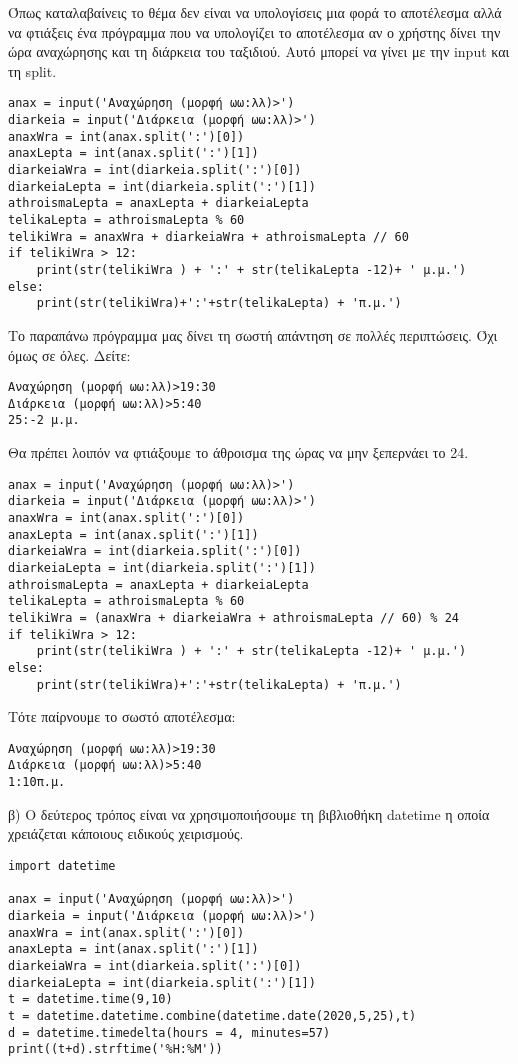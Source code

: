 Όπως καταλαβαίνεις το θέμα δεν είναι να υπολογίσεις μια φορά το αποτέλεσμα αλλά να φτιάξεις ένα πρόγραμμα που να υπολογίζει το αποτέλεσμα αν ο χρήστης δίνει την ώρα αναχώρησης και τη διάρκεια του ταξιδιού. Αυτό μπορεί να γίνει με την input και τη split.
\begin{lstlisting}
anax = input('Αναχώρηση (μορφή ωω:λλ)>')
diarkeia = input('Διάρκεια (μορφή ωω:λλ)>')
anaxWra = int(anax.split(':')[0])
anaxLepta = int(anax.split(':')[1])
diarkeiaWra = int(diarkeia.split(':')[0])
diarkeiaLepta = int(diarkeia.split(':')[1])
athroismaLepta = anaxLepta + diarkeiaLepta
telikaLepta = athroismaLepta % 60
telikiWra = anaxWra + diarkeiaWra + athroismaLepta // 60
if telikiWra > 12:
    print(str(telikiWra ) + ':' + str(telikaLepta -12)+ ' μ.μ.')
else:
    print(str(telikiWra)+':'+str(telikaLepta) + 'π.μ.')
\end{lstlisting}

Το παραπάνω πρόγραμμα μας δίνει τη σωστή απάντηση σε πολλές περιπτώσεις. Όχι όμως σε όλες. Δείτε:
\begin{lstlisting}
Αναχώρηση (μορφή ωω:λλ)>19:30
Διάρκεια (μορφή ωω:λλ)>5:40
25:-2 μ.μ.
\end{lstlisting}
Θα πρέπει λοιπόν να φτιάξουμε το άθροισμα της ώρας να μην ξεπερνάει το 24.
\begin{lstlisting}
anax = input('Αναχώρηση (μορφή ωω:λλ)>')
diarkeia = input('Διάρκεια (μορφή ωω:λλ)>')
anaxWra = int(anax.split(':')[0])
anaxLepta = int(anax.split(':')[1])
diarkeiaWra = int(diarkeia.split(':')[0])
diarkeiaLepta = int(diarkeia.split(':')[1])
athroismaLepta = anaxLepta + diarkeiaLepta
telikaLepta = athroismaLepta % 60
telikiWra = (anaxWra + diarkeiaWra + athroismaLepta // 60) % 24
if telikiWra > 12:
    print(str(telikiWra ) + ':' + str(telikaLepta -12)+ ' μ.μ.')
else:
    print(str(telikiWra)+':'+str(telikaLepta) + 'π.μ.')
\end{lstlisting}

Τότε παίρνουμε το σωστό αποτέλεσμα:
\begin{lstlisting}
Αναχώρηση (μορφή ωω:λλ)>19:30
Διάρκεια (μορφή ωω:λλ)>5:40
1:10π.μ.
\end{lstlisting}

β)
Ο δεύτερος τρόπος είναι να χρησιμοποιήσουμε τη βιβλιοθήκη datetime η οποία χρειάζεται κάποιους ειδικούς χειρισμούς.
\begin{lstlisting}
import datetime

anax = input('Αναχώρηση (μορφή ωω:λλ)>')
diarkeia = input('Διάρκεια (μορφή ωω:λλ)>')
anaxWra = int(anax.split(':')[0])
anaxLepta = int(anax.split(':')[1])
diarkeiaWra = int(diarkeia.split(':')[0])
diarkeiaLepta = int(diarkeia.split(':')[1])
t = datetime.time(9,10)
t = datetime.datetime.combine(datetime.date(2020,5,25),t)
d = datetime.timedelta(hours = 4, minutes=57)
print((t+d).strftime('%H:%M'))
\end{lstlisting}

